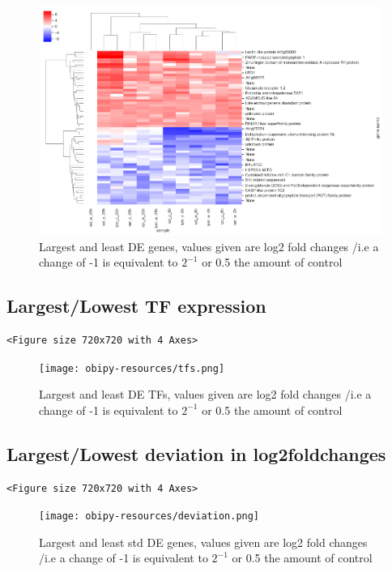 \documentclass[a4paper]{article}
\begin{document}
\begin{figure}[htbp]
\centering
\includegraphics[width=15cm]{obipy-resources/large.png}
\caption{\label{largest}
Largest and least DE genes, values given are log2 fold changes /i.e a change of -1 is equivalent to \(2^{-1}\) or 0.5 the amount of control}
\end{figure}

\subsection{Largest/Lowest TF expression}
\label{sec:org6a47a65}

\begin{verbatim}
<Figure size 720x720 with 4 Axes>
\end{verbatim}

\begin{figure}[htbp]
\centering
\texttt{[image: obipy-resources/tfs.png]}
\caption{\label{tfs}
Largest and least DE TFs, values given are log2 fold changes /i.e a change of -1 is equivalent to \(2^{-1}\) or 0.5 the amount of control}
\end{figure}



\subsection{Largest/Lowest deviation in log2foldchanges}
\label{sec:orgd8b7154}

\begin{verbatim}
<Figure size 720x720 with 4 Axes>
\end{verbatim}

\begin{figure}[htbp]
\centering
\texttt{[image: obipy-resources/deviation.png]}
\caption{\label{largest}
Largest and least std DE genes, values given are log2 fold changes /i.e a change of -1 is equivalent to \(2^{-1}\) or 0.5 the amount of control}
\end{figure}
\end{document}
